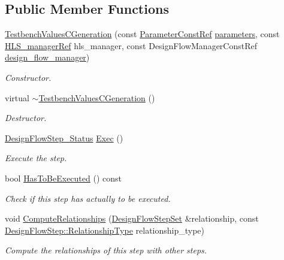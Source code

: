 \subsection*{Public Member Functions}
\begin{DoxyCompactItemize}
\item 
\hyperlink{classTestbenchValuesCGeneration_aaaa5f459d34d2910f24c1634ddd0a8d6}{Testbench\+Values\+C\+Generation} (const \hyperlink{Parameter_8hpp_a37841774a6fcb479b597fdf8955eb4ea}{Parameter\+Const\+Ref} \hyperlink{classDesignFlowStep_a802eaafe8013df706370679d1a436949}{parameters}, const \hyperlink{hls__manager_8hpp_acd3842b8589fe52c08fc0b2fcc813bfe}{H\+L\+S\+\_\+manager\+Ref} hls\+\_\+manager, const Design\+Flow\+Manager\+Const\+Ref \hyperlink{classDesignFlowStep_ab770677ddf087613add30024e16a5554}{design\+\_\+flow\+\_\+manager})
\begin{DoxyCompactList}\small\item\em Constructor. \end{DoxyCompactList}\item 
virtual \hyperlink{classTestbenchValuesCGeneration_acba3aa40be304fa197785c1b8c47cb6f}{$\sim$\+Testbench\+Values\+C\+Generation} ()
\begin{DoxyCompactList}\small\item\em Destructor. \end{DoxyCompactList}\item 
\hyperlink{design__flow__step_8hpp_afb1f0d73069c26076b8d31dbc8ebecdf}{Design\+Flow\+Step\+\_\+\+Status} \hyperlink{classTestbenchValuesCGeneration_a964570c06f70ce449d63410d9e7b6d81}{Exec} ()
\begin{DoxyCompactList}\small\item\em Execute the step. \end{DoxyCompactList}\item 
bool \hyperlink{classTestbenchValuesCGeneration_a56bdb926fdd2e5f08906706e8fba4df5}{Has\+To\+Be\+Executed} () const
\begin{DoxyCompactList}\small\item\em Check if this step has actually to be executed. \end{DoxyCompactList}\item 
void \hyperlink{classTestbenchValuesCGeneration_a3724358a7237a76d6446d9bcb1ffff7c}{Compute\+Relationships} (\hyperlink{classDesignFlowStepSet}{Design\+Flow\+Step\+Set} \&relationship, const \hyperlink{classDesignFlowStep_a723a3baf19ff2ceb77bc13e099d0b1b7}{Design\+Flow\+Step\+::\+Relationship\+Type} relationship\+\_\+type)
\begin{DoxyCompactList}\small\item\em Compute the relationships of this step with other steps. \end{DoxyCompactList}\end{DoxyCompactItemize}
